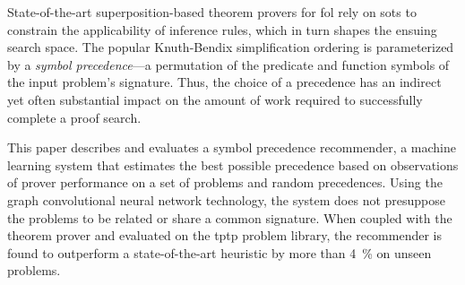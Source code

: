 
State-of-the-art superposition-based theorem provers for \acrlong{fol}
rely on \glspl{sot} to constrain the applicability of inference rules,
which in turn shapes the ensuing search space.
The popular Knuth-Bendix simplification ordering is parameterized by 
a \emph{symbol precedence}---a permutation of the predicate and function symbols
of the input problem's signature.
Thus, the choice of a precedence has an indirect yet often substantial impact
on the amount of work required to successfully complete a proof search.

This paper describes and evaluates a symbol precedence recommender,
a machine learning system that estimates the best possible precedence
based on observations of prover performance on a set of problems and random precedences.
Using the graph convolutional neural network technology,
the system does not presuppose the problems to be related or share a common signature. 
When coupled with the theorem prover \Vampire{} and evaluated on the \acrshort{tptp} problem library,
the recommender is found to outperform a state-of-the-art heuristic by more than \SI{4}{\percent}
on unseen problems.




